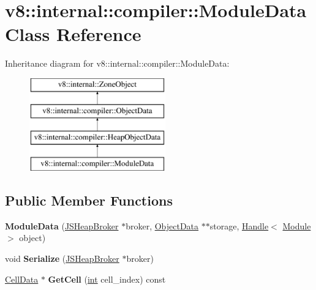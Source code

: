 \hypertarget{classv8_1_1internal_1_1compiler_1_1ModuleData}{}\section{v8\+:\+:internal\+:\+:compiler\+:\+:Module\+Data Class Reference}
\label{classv8_1_1internal_1_1compiler_1_1ModuleData}
Inheritance diagram for v8\+:\+:internal\+:\+:compiler\+:\+:Module\+Data\+:\begin{figure}[H]
\begin{center}
\leavevmode
\includegraphics[height=4.000000cm]{classv8_1_1internal_1_1compiler_1_1ModuleData}
\end{center}
\end{figure}
\subsection*{Public Member Functions}
\begin{DoxyCompactItemize}
\item 
\mbox{\label{classv8_1_1internal_1_1compiler_1_1ModuleData_aea6d53f05151ba558a47bbdd6c7960d9}} 
{\bfseries Module\+Data} (\mbox{\hyperlink{classv8_1_1internal_1_1compiler_1_1JSHeapBroker}{J\+S\+Heap\+Broker}} $\ast$broker, \mbox{\hyperlink{classv8_1_1internal_1_1compiler_1_1ObjectData}{Object\+Data}} $\ast$$\ast$storage, \mbox{\hyperlink{classv8_1_1internal_1_1Handle}{Handle}}$<$ \mbox{\hyperlink{classv8_1_1internal_1_1Module}{Module}} $>$ object)
\item 
\mbox{\label{classv8_1_1internal_1_1compiler_1_1ModuleData_a71cb86ca99714b52160479e4604dbd67}} 
void {\bfseries Serialize} (\mbox{\hyperlink{classv8_1_1internal_1_1compiler_1_1JSHeapBroker}{J\+S\+Heap\+Broker}} $\ast$broker)
\item 
\mbox{\label{classv8_1_1internal_1_1compiler_1_1ModuleData_ad7d5f4a9369d93a5211a6ec87481576b}} 
\mbox{\hyperlink{classv8_1_1internal_1_1compiler_1_1CellData}{Cell\+Data}} $\ast$ {\bfseries Get\+Cell} (\mbox{\hyperlink{classint}{int}} cell\+\_\+index) const
\end{DoxyCompactItemize}
